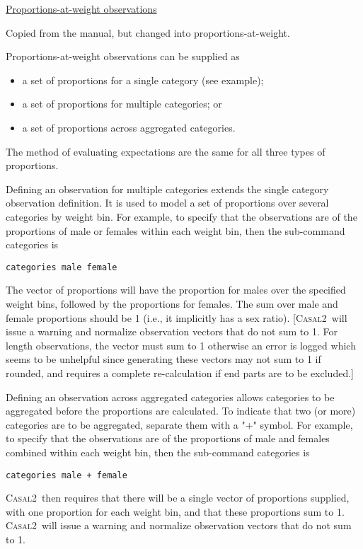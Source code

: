 \documentclass[a4paper,11pt,twoside,pdftex,draft]{article}
\newcommand{\CNAME}{\textsc{Casal2}}
\begin{document}
\bigskip
\underline{Proportions-at-weight observations}

Copied from the manual, but changed into proportions-at-weight.

Proportions-at-weight observations can be supplied as

\begin{itemize}
	\item a set of proportions for a single category (see example);
	\item a set of proportions for multiple categories; or
	\item a set of proportions across aggregated categories.
\end{itemize}

The method of evaluating expectations are the same for all three types of proportions.

Defining an observation for multiple categories extends the single category observation definition. It is used to model a set of proportions over several categories by weight bin. For example, to specify that the observations are of the proportions of male or females within each weight bin, then the sub-command categories is

\texttt{categories male female}

The vector of proportions will have the proportion for males over the specified weight bins, followed by the proportions for females. The sum over male and female proportions should be 1 (i.e., it implicitly has a sex ratio). [\CNAME~will issue a warning and normalize observation vectors that do not sum to 1. For length observations, the vector must sum to 1 otherwise an error is logged which seems to be unhelpful since generating these vectors may not sum to 1 if rounded, and requires a complete re-calculation if end parts are to be excluded.]

Defining an observation across aggregated categories allows categories to be aggregated before the proportions are calculated.  To indicate that two (or more) categories are to be aggregated, separate them with a "+" symbol. For example, to specify that the observations are of the proportions of male and females combined within each weight bin, then the sub-command categories is

\texttt{categories male + female}

\CNAME~then requires that there will be a single vector of proportions supplied, with one proportion for each weight bin, and that these proportions sum to 1. \CNAME~will issue a warning and normalize observation vectors that do not sum to 1.
\end{document}

